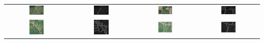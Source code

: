 \documentclass[12pt,a4paper]{article}
\begin{document}
\begin{tabular}{ c c c c}
 \includegraphics[width=0.25\textwidth]{./pictures/fimg10.png} & \includegraphics[width=0.25\textwidth]{./pictures/fimg10.png_final_img.jpg} & \includegraphics[width=0.25\textwidth]{./pictures/fimg11.png} & \includegraphics[width=0.25\textwidth]{./pictures/fimg11.png_final_img.jpg}\\ \includegraphics[width=0.25\textwidth]{./pictures/fimg9.jpeg} & \includegraphics[width=0.25\textwidth]{./pictures/fimg9.jpeg_final_img.jpg} & \includegraphics[width=0.25\textwidth]{./pictures/fimg14.png} & \includegraphics[width=0.25\textwidth]{./pictures/fimg14.png_final_img.jpg}
\end{tabular}
\end{document}
